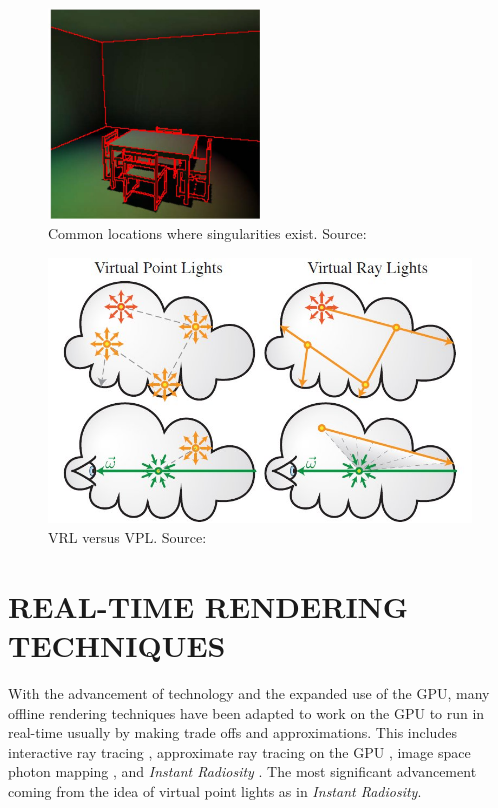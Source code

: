 \begin{figure}[h!]
  \centering
    \includegraphics[width=0.5\textwidth]{singularity.jpg}
  \caption{Common locations where singularities exist. Source: \protect\cite{Dachsbacher2005}}
	\label{fig:singularity}
\end{figure}

\begin{figure}[h!]
  \centering
    \includegraphics[width=1.0\textwidth]{vrl.jpg}
  \caption{VRL versus VPL. Source: \protect\cite{Novak2012}}
	\label{fig:vrl}
\end{figure}

\section{REAL-TIME RENDERING TECHNIQUES} \label{sec:RT}

With the advancement of technology and the expanded use of the GPU, many offline rendering techniques have been adapted to work on the GPU to run in real-time usually by making trade offs and approximations.  This includes interactive ray tracing \cite{Wald2002}, approximate ray tracing on the GPU \cite{Kalos2005}, image space photon mapping \cite{McGuire2009}, and \textit{Instant Radiosity} \cite{Keller1997}.  The most significant advancement coming from the idea of virtual point lights as in \textit{Instant Radiosity}.

